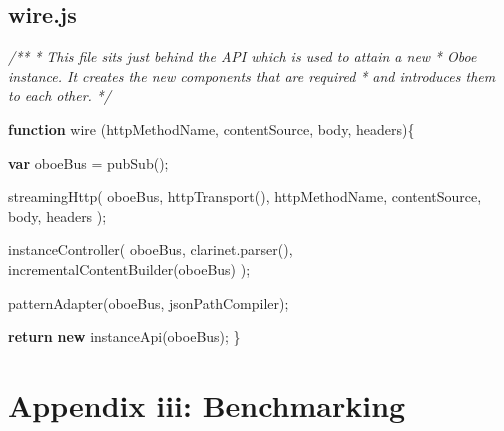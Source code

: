 \documentclass[12pt, ]{article}
\let\stdsection\section
\renewcommand\section{\newpage\stdsection}
\newenvironment{Shaded}{}{}
\newcommand{\KeywordTok}[1]{\textcolor[rgb]{0.00,0.44,0.13}{\textbf{{#1}}}}
\newcommand{\CommentTok}[1]{\textcolor[rgb]{0.38,0.63,0.69}{\textit{{#1}}}}
\newcommand{\OtherTok}[1]{\textcolor[rgb]{0.00,0.44,0.13}{{#1}}}
\newcommand{\FunctionTok}[1]{\textcolor[rgb]{0.02,0.16,0.49}{{#1}}}
\newcommand{\NormalTok}[1]{{#1}}
\begin{document}
\pagebreak

\subsection{wire.js}\label{headerux5fwire}

\label{src_wire}

\begin{Shaded}
\begin{Highlighting}[]
\CommentTok{/**}
\CommentTok{ * This file sits just behind the API which is used to attain a new}
\CommentTok{ * Oboe instance. It creates the new components that are required}
\CommentTok{ * and introduces them to each other.}
\CommentTok{ */}

\KeywordTok{function} \FunctionTok{wire} \NormalTok{(httpMethodName, contentSource, body, headers)\{}

   \KeywordTok{var} \NormalTok{oboeBus = }\FunctionTok{pubSub}\NormalTok{();}
               
   \FunctionTok{streamingHttp}\NormalTok{( oboeBus,}
                  \FunctionTok{httpTransport}\NormalTok{(), }
                  \NormalTok{httpMethodName, contentSource, body, headers );                              }
     
   \FunctionTok{instanceController}\NormalTok{( }
               \NormalTok{oboeBus, }
               \OtherTok{clarinet}\NormalTok{.}\FunctionTok{parser}\NormalTok{(), }
               \FunctionTok{incrementalContentBuilder}\NormalTok{(oboeBus) }
   \NormalTok{);}
      
   \FunctionTok{patternAdapter}\NormalTok{(oboeBus, jsonPathCompiler);      }
      
   \KeywordTok{return} \KeywordTok{new} \FunctionTok{instanceApi}\NormalTok{(oboeBus);}
\NormalTok{\}}
\end{Highlighting}
\end{Shaded}

\section{Appendix iii: Benchmarking}\label{appendix-iii-benchmarking}


\label{src_benchmarkClient}
\end{document}
